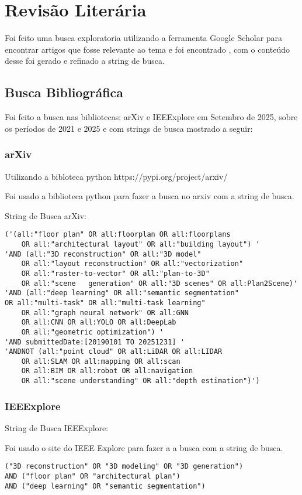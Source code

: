 \chapter{Revisão Literária}\label{cp:revisaoliteraria}
Foi feito uma busca exploratoria utilizando a ferramenta Google Scholar  para encontrar artigos que fosse relevante ao tema e foi encontrado \cite{kratochvila2024multi}, com o conteúdo desse foi gerado e refinado a string de busca.

\section{Busca Bibliográfica}\label{cp:refteory:figuras}
Foi feito a busca nas bibliotecas: arXiv e IEEExplore em Setembro de 2025, sobre os períodos de 2021 e 2025 e com strings de busca mostrado a seguir:
   
\subsection{arXiv}
Utilizando a bibloteca python https://pypi.org/project/arxiv/

Foi usado a biblioteca python para fazer a busca no arxiv com a string de busca.

String de Busca arXiv: 
\begin{verbatim}
('(all:"floor plan" OR all:floorplan OR all:floorplans 
    OR all:"architectural layout" OR all:"building layout") ' 
'AND (all:"3D reconstruction" OR all:"3D model" 
    OR all:"layout reconstruction" OR all:"vectorization" 
    OR all:"raster-to-vector" OR all:"plan-to-3D" 
    OR all:"scene   generation" OR all:"3D scenes" OR all:Plan2Scene)'
'AND (all:"deep learning" OR all:"semantic segmentation" 
OR all:"multi-task" OR all:"multi-task learning" 
    OR all:"graph neural network" OR all:GNN 
    OR all:CNN OR all:YOLO OR all:DeepLab 
    OR all:"geometric optimization") '
'AND submittedDate:[20190101 TO 20251231] '
'ANDNOT (all:"point cloud" OR all:LiDAR OR all:LIDAR  
    OR all:SLAM OR all:mapping OR all:scan 
    OR all:BIM OR all:robot OR all:navigation 
    OR all:"scene understanding" OR all:"depth estimation")')
\end{verbatim}
\subsection{IEEExplore}
String de Busca IEEExplore:

Foi usado o site do IEEE Explore para fazer a a busca com a string de busca.
\begin{verbatim}
("3D reconstruction" OR "3D modeling" OR "3D generation") 
AND ("floor plan" OR "architectural plan") 
AND ("deep learning" OR "semantic segmentation")
\end{verbatim}

